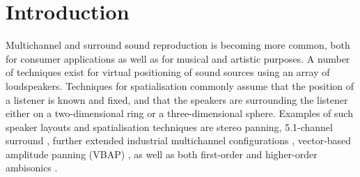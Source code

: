 \documentclass[twoside,10pt]{article}
\title{\papertitle}
\begin{document}
    
\maketitle




%
%




\begin{abstract}
The abstract should be placed at the top left column and should contain
about 150 words.
\end{abstract}








%
%


\section{Introduction}\label{sec:introduction}

Multichannel and surround sound reproduction is becoming more common, both for consumer applications as well as for musical and artistic purposes. A number of techniques exist for virtual positioning of sound sources using an array of loudspeakers.  Techniques for spatialisation commonly assume that the position of a listener is known and fixed, and that the speakers are surrounding the listener either on a two-dimensional ring or a three-dimensional sphere. Examples of such speaker layouts and spatialisation techniques are stereo panning, 5.1-channel surround \cite{ITU:1993_surround_5:1}, further extended industrial multichannel configurations \cite{Rumsey:2001spatial_audio}, vector-based amplitude panning (VBAP) \cite{Pulkki:1997vbap}, as well as both first-order and higher-order ambisonics \cite{Gerzon:1974surround, Poletti:2000holographic_sound}.
\end{document}
